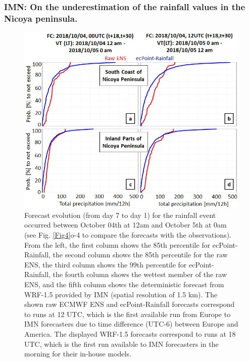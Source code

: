 \documentclass[twocol]{ametsocV5} %
\begin{document}
\subsubsection{IMN: On the underestimation of the rainfall values in the Nicoya peninsula.}

\begin{figure}
\centerline{\includegraphics[width=39pc]{manuscript/Figures/Fig7.jpg}}
\caption{Forecast evolution (from day 7 to day 1) for the rainfall event occurred between October 04th at 12am and October 5th at 0am (see Fig. \ref{Fig4}o-4 to compare the forecasts with the observations). From the left, the first column shows the 85th percentile for ecPoint-Rainfall, the second column shows the 85th percentile for the raw ENS, the third column shows the 99th percentile for ecPoint-Rainfall, the fourth column shows the wettest member of the raw ENS, and the fifth column shows the deterministic forecast from WRF-1.5 provided by IMN (spatial resolution of 1.5 km). The shown raw ECMWF ENS and ecPoint-Rainfall forecasts correspond to runs at 12 UTC, which is the first available run from Europe to IMN forecasters due to time difference (UTC-6) between Europe and America. The displayed WRF-1.5 forecasts correspond to runs at 18 UTC, which is the first run available to IMN forecasters in the morning for their in-house models.}
\label{Fig7}
\end{figure}
\end{document}
